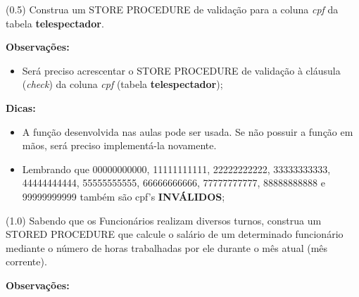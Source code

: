 \documentclass[12pt]{exam}
\begin{document}
\begin{questions}
\question (0.5) Construa um STORE PROCEDURE de validação para a coluna \textit{cpf} da tabela \textbf{telespectador}.

\vspace{2px}

 \textbf{Observações:}

    \begin{itemize}
        \item Será preciso acrescentar o STORE PROCEDURE de validação à cláusula (\textit{check}) da coluna \textit{cpf} (tabela \textbf{telespectador});
    \end{itemize}

\textbf{Dicas:}

    \begin{itemize}
   \item A função desenvolvida nas aulas pode ser usada. Se não possuir a função em mãos, será preciso implementá-la novamente.
   
   \item Lembrando que 00000000000, 11111111111, 22222222222, 33333333333, 44444444444, 55555555555, 66666666666, 77777777777, 88888888888 e 99999999999 também são cpf's \textbf{INVÁLIDOS};
  \end{itemize}
  
\question (1.0) Sabendo que os Funcionários realizam diversos turnos, construa um STORED PROCEDURE que calcule o salário de um determinado funcionário mediante o número de horas trabalhadas por ele durante o mês atual (mês corrente). 

\vspace{2px}

\textbf{Observações:} 


\end{questions}
\end{document}
